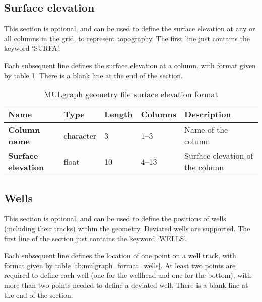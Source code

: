 \subsection{Surface elevation}
This section is optional, and can be used to define the surface elevation at any or all columns in the grid, to represent topography. The first line just contains the keyword `SURFA'.

Each subsequent line defines the surface elevation at a column, with format given by table \ref{tb:mulgraph_format_surface}. There is a blank line at the end of the section.

\begin{table}[h]
  \begin{center}
    \begin{tabular}{|p{20mm}|l|l|l|p{50mm}|}
      \hline
      \textbf{Name} & \textbf{Type} & \textbf{Length} & \textbf{Columns} & \textbf{Description}\\
      \hline
      \textbf{Column name} & character & 3 & 1--3 & Name of the column\\
      \hline
      \textbf{Surface elevation} & float & 10 & 4--13 & Surface elevation of the column\\
      \hline
    \end{tabular}
    \caption{MULgraph geometry file surface elevation format}
    \label{tb:mulgraph_format_surface}
  \end{center}
\end{table}

\subsection{Wells}
This section is optional, and can be used to define the positions of wells (including their tracks) within the geometry. Deviated wells are supported. The first line of the section just contains the keyword `WELLS'.

Each subsequent line defines the location of one point on a well track, with format given by table \ref{tb:mulgraph_format_wells}. At least two points are required to define each well (one for the wellhead and one for the bottom), with more than two points needed to define a deviated well. There is a blank line at the end of the section.

